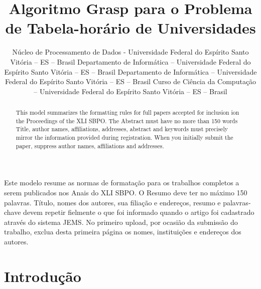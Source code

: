\documentclass[11pt]{article}
\title{Algoritmo Grasp para o Problema de Tabela-horário de Universidades}
\author{\sbpoauthor{Walace S. Rocha}
                   {Núcleo de Processamento de Dados - Universidade Federal do Espírito Santo}
                   {Vitória -- ES -- Brasil}
                   {\email{walacesrocha@yahoo.com.br}}
        \sbpoauthor{Maria C. S. Boeres}
                   {Departamento de Informática -- Universidade Federal do Espírito Santo}
                   {Vitória -- ES -- Brasil}
                   {\email{boeres@inf.ufes.br}}
        \sbpoauthor{Maria C. Rangel}
                   {Departamento de Informática -- Universidade Federal do Espírito Santo}
                   {Vitória -- ES -- Brasil}
                   {\email{crangel@inf.ufes.br}}
        \sbpoauthor{Leandro B. Ferreira}
                   {Curso de Ciência da Computação -- Universidade Federal do Espírito Santo}
                   {Vitória -- ES -- Brasil}
                   {\email{leandrobfe@gmail.com}}}
\begin{document}
 

\maketitle


\begin{resumo} 
  Este modelo resume as normas de formatação para os trabalhos completos a serem publicados nos Anais do XLI SBPO. O Resumo deve ter no máximo 150 palavras. Título, nomes dos autores, sua filiação e endereços, resumo e palavras-chave devem repetir fielmente o que foi informado quando o artigo foi cadastrado através do sistema JEMS. No primeiro upload, por ocasião da submissão do trabalho, exclua desta primeira página os nomes, instituições e endereços dos autores.
\end{resumo}


\begin{abstract}
  This model summarizes the formatting rules for full papers accepted for inclusion ion the Proceedings of the XLI SBPO. The Abstract must have no more than 150 words Title, author names, affiliations, addresses, abstract and keywords must precisely mirror the information provided during registration. When you initially submit the paper, suppress author names, affiliations and addresses.
\end{abstract}

\newpage
 
\section{Introdução}
\end{document}
